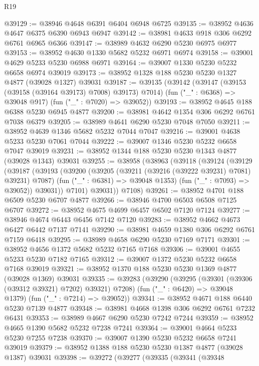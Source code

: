 \begin{lexlean}{R19}
\begin{coremodule}
@39129 := @38946 @4648 @6391 @6404 @6948 @6725
@39135 := @38952 @4636 @4647 @6375 @6390 @6943 @6947
@39142 := @38981 @4633 @918 @306 @6292 @6761 @6965 @6366
@39147 := @38989 @4632 @6290 @5230 @6975 @6977
@39153 := @38952 @4630 @1330 @5682 @5232 @6971 @6974
@39158 := @39001 @4629 @5233 @5230 @6988 @6971
@39164 := @39007 @1330 @5230 @5232 @6658 @6974 @39019
@39173 := @38952 @1328 @188 @5230 @5230 @1327 @4877 (@39028 @1327) @39031
@39187 := @39135
    (@39142
      (@39147 (@39153 (@39158 (@39164 @39173) @7008) @39173) @7014)
      (fun ("_" : @6368) => @39048 @917)
      (fun ("_" : @7020) => @39052))
@39193 := @38952 @4645 @188 @6388 @5230 @6945 @4877
@39200 := @38981 @4642 @1354 @306 @6292 @6761 @7038 @6379
@39205 := @38989 @4641 @6290 @5230 @7048 @7050
@39211 := @38952 @4639 @1346 @5682 @5232 @7044 @7047
@39216 := @39001 @4638 @5233 @5230 @7061 @7044
@39222 := @39007 @1346 @5230 @5232 @6658 @7047 @39019
@39231 := @38952 @1344 @188 @5230 @5230 @1343 @4877 (@39028 @1343) @39031
@39255 := @38958
    (@38963
      (@39118
        (@39124
          (@39129
            (@39187
              (@39193
                (@39200
                  (@39205 (@39211 (@39216 (@39222 @39231) @7081) @39231) @7087)
                  (fun ("_" : @6381) => @39048 @1353)
                  (fun ("_" : @7093) => @39052))
                @39031))
            @7101)
          @39031))
      @7108)
@39261 := @38952 @4701 @188 @6509 @5230 @6707 @4877
@39266 := @38946 @4700 @6503 @6508 @7125 @6707
@39272 := @38952 @4675 @4699 @6457 @6502 @7120 @7124
@39277 := @38946 @4674 @6443 @6456 @7142 @7120
@39283 := @38952 @4662 @4673 @6427 @6442 @7137 @7141
@39290 := @38981 @4659 @1380 @306 @6292 @6761 @7159 @6418
@39295 := @38989 @4658 @6290 @5230 @7169 @7171
@39301 := @38952 @4656 @1372 @5682 @5232 @7165 @7168
@39306 := @39001 @4655 @5233 @5230 @7182 @7165
@39312 := @39007 @1372 @5230 @5232 @6658 @7168 @39019
@39321 := @38952 @1370 @188 @5230 @5230 @1369 @4877 (@39028 @1369) @39031
@39335 := @39283
    (@39290
      (@39295 (@39301 (@39306 (@39312 @39321) @7202) @39321) @7208)
      (fun ("_" : @6420) => @39048 @1379)
      (fun ("_" : @7214) => @39052))
@39341 := @38952 @4671 @188 @6440 @5230 @7139 @4877
@39348 := @38981 @4668 @1398 @306 @6292 @6761 @7232 @6431
@39353 := @38989 @4667 @6290 @5230 @7242 @7244
@39359 := @38952 @4665 @1390 @5682 @5232 @7238 @7241
@39364 := @39001 @4664 @5233 @5230 @7255 @7238
@39370 := @39007 @1390 @5230 @5232 @6658 @7241 @39019
@39379 := @38952 @1388 @188 @5230 @5230 @1387 @4877 (@39028 @1387) @39031
@39398 := @39272
    (@39277
      (@39335
        (@39341
          (@39348

\end{coremodule}
\end{lexlean}
